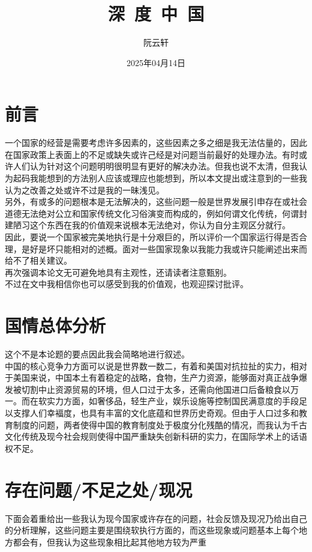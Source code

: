 \documentclass[supercite]{Experimental_Report}
\title{深~度~中~国}
\author{阮云轩}
\date{2025年04月14日}
\theoremstyle{definition}
\begin{document}
	
	\maketitle
	
	\clearpage
	
	
	\tableofcontents[level=2]
	
	\clearpage
	
	
	\section{前言}
	
	一个国家的经营是需要考虑许多因素的，这些因素之多之细是我无法估量的，因此在国家政策上表面上的不足或缺失或许己经是对问题当前最好的处理办法。有时或许人们认为针对这个问题明明很明显有更好的解决办法。但我也说不太清，但我认为起码我能想到的方法别人应该或理应也能想到，所以本文提出或注意到的一些我认为之改善之处或许不过是我的一昧浅见。\\另外，有或多的问题根本是无法解决的，这些问题一般是世界发展引申存在或社会道德无法绝对公立和国家传统文化习俗演变而构成的，例如何谓文化传统，何谓封建陋习这个东西在我的价值观来说根本无法绝对，你认为自分主观区分就行。\\因此，要说一个国家被完美地执行是十分艰巨的，所以评价一个国家运行得是否合理，是好是坏只能相对的述概。面对一些国家现象以我能力我或许只能阐述出来而给不了相关建议。
	\\再次强调本论文无可避免地具有主观性，还请读者注意甄别。
	\\不过在文中我相信你也可以感受到我的价值观，也观迎探讨批评。
	
	
	\section{国情总体分析}
	这个不是本论题的要点因此我会简略地进行叙述。\\
	中国的核心竞争力方面可以说是世界数一数二，有着和美国对抗拉扯的实力，相对于美国来说，中国本土有着稳定的战略，食物，生产力资源，能够面对真正战争爆发被切割中止资源贸易的环境，但人口过于太多，还需向他国进口后备粮食以万一。而在软实力方面，如奢侈品，轻生产业，娱乐设施等控制国民满意度的手段足以支撑人们幸褔度，也具有丰富的文化底蕴和世界历史奇观。但由于人口过多和教育制度的问题，两者使得中国的教育制度处于极度分化残酷的情况，而我认为千古文化传统及现今社会规则使得中国严重缺失创新科研的实力，在国际学术上的话语权不足。
	
	\section{存在问题/不足之处/现况}
	下面会着重给出一些我认为现今国家或许存在的问题，社会反馈及现况乃给出自己的分析理解，这些问题主要是围绕软执行方面的，而这些现象或问题基本上每个地方都会有，但我认为这些现象相比起其他地方较为严重
\end{document}
